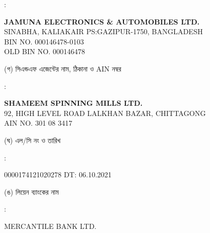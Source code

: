 \documentclass[12pt]{article}
\newcommand{\lcno}{0000174121020278}
\newcommand{\lcdt}{06.10.2021}
\newcommand{\lienbank}{MERCANTILE BANK LTD.}
\newcommand{\jeal}{JAMUNA ELECTRONICS \& AUTOMOBILES LTD.}
\newcommand{\impn}{\jeal}
\newcommand{\impadd}{SINABHA, KALIAKAIR
\newline
PS:GAZIPUR-1750, BANGLADESH}
\newcommand{\impbin}{000146478-0103}
\newcommand{\impoldbin}{000146478}
\newcommand{\cnfn}{SHAMEEM SPINNING MILLS LTD.}
\newcommand{\cnfadd}{92, HIGH LEVEL ROAD
\newline
LALKHAN BAZAR, CHITTAGONG}
\newcommand{\cnfain}{301 08 3417}
\begin{document}
\begin{minipage}[t]{0.02\linewidth}
:
\end{minipage}
\begin{minipage}[t]{0.50\linewidth}
\textbf{{\impn}}
\\
{\impadd}
\\
BIN NO. {\impbin}
\\
OLD BIN NO. {\impoldbin}
\\
\end{minipage}
\begin{minipage}[t]{0.05\linewidth}
\hspace*{1em}
\end{minipage}
\begin{minipage}[t]{0.45\linewidth}
(গ) সিএন্ডএফ এজেন্টের নাম, ঠিকানা
ও AIN নম্বর
\end{minipage}
\begin{minipage}[t]{0.02\linewidth}
:
\end{minipage}
\begin{minipage}[t]{0.50\linewidth}
\textbf{{\cnfn}}
\\
{\cnfadd}
\\
AIN NO. {\cnfain}
\\
\end{minipage}
\begin{minipage}[t]{0.05\linewidth}
\hspace*{1em}
\end{minipage}
\begin{minipage}[t]{0.45\linewidth}
(ঘ) এল/সি নং ও তারিখ
\end{minipage}
\begin{minipage}[t]{0.02\linewidth}
:
\end{minipage}
\begin{minipage}[t]{0.50\linewidth}
{\lcno} \hspace{2em} DT: {\lcdt}
\\
\end{minipage}
\begin{minipage}[t]{0.05\linewidth}
\hspace*{1em}
\end{minipage}
\begin{minipage}[t]{0.45\linewidth}
(ঙ) লিয়েন ব্যাংকের নাম
\end{minipage}
\begin{minipage}[t]{0.02\linewidth}
:
\end{minipage}
\begin{minipage}[t]{0.50\linewidth}
{\lienbank}
\\
\end{minipage}
\end{document}
